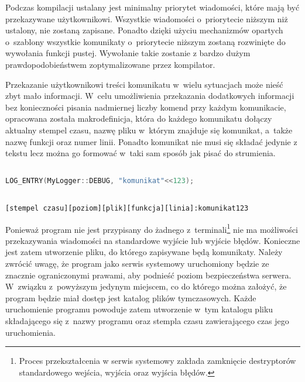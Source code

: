 Podczas kompilacji ustalany jest minimalny priorytet wiadomości, które
mają być przekazywane użytkownikowi. Wszystkie wiadomości
o~priorytecie niższym niż ustalony, nie zostaną zapisane. Ponadto
dzięki użyciu mechanizmów opartych o~szablony wszystkie komunikaty
o~priorytecie niższym zostaną rozwinięte do wywołania funkcji
pustej. Wywołanie takie zostanie z bardzo dużym prawdopodobieństwem
zoptymalizowane przez kompilator.

Przekazanie użytkownikowi treści komunikatu w~wielu sytuacjach może
nieść zbyt mało informacji. W~celu umożliwienia przekazania
dodatkowych informacji bez konieczności pisania nadmiernej liczby
komend przy każdym komunikacie, opracowana została makrodefinicja,
która do każdego komunikatu dołączy aktualny stempel czasu, nazwę
pliku w~którym znajduje się komunikat, a~także nazwę funkcji oraz
numer linii. Ponadto komunikat nie musi się składać jedynie z tekstu
lecz można go formować w~taki sam sposób jak pisać do strumienia.

\vspace{0.5cm}
\begin{minipage}{\textwidth}
  \begin{lstlisting}[language=c++, breaklines=true,
    linewidth=0.99\textwidth, caption=Przykładowe wypisanie
    komunikatu]

LOG_ENTRY(MyLogger::DEBUG, "komunikat"<<123);

\end{lstlisting}
\end{minipage}
\vspace{0.5cm}

\vspace{0.5cm}
\begin{minipage}{\textwidth}
\begin{lstlisting}[linewidth=0.99\textwidth, caption=Format komunikatu przekazywanego użytkownikowi]

[stempel czasu][poziom][plik][funkcja][linia]:komunikat123

\end{lstlisting}
\end{minipage}
\vspace{0.5cm}

Ponieważ program nie jest przypisany do żadnego
z~terminali\footnote{Proces przekształcenia w serwis systemowy zakłada
  zamknięcie destryptorów standardowego wejścia, wyjścia oraz wyjścia
  błędów.} nie ma możliwości przekazywania wiadomości na standardowe
wyjście lub wyjście błędów. Konieczne jest zatem utworzenie pliku, do
którego zapisywane będą komunikaty. Należy zwrócić uwagę, że program
jako serwis systemowy uruchomiony będzie ze znacznie ograniczonymi
prawami, aby podnieść poziom bezpieczeństwa serwera. W~związku
z~powyższym jedynym miejscem, co do którego można założyć, że program
będzie miał dostęp jest katalog plików tymczasowych. Każde
uruchomienie programu powoduje zatem utworzenie w~tym katalogu pliku
składającego się z~nazwy programu oraz stempla czasu zawierającego
czas jego uruchomienia.
